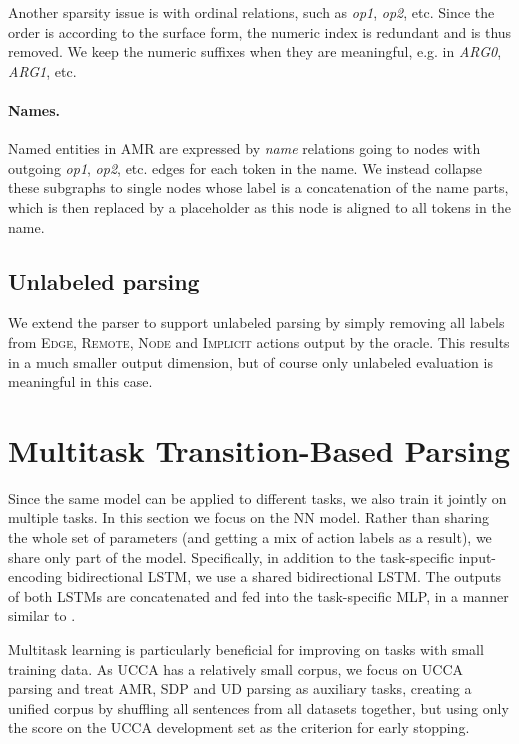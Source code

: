 \documentclass[11pt,a4paper]{article}
\begin{document}
Another sparsity issue is with ordinal relations, such as \textit{op1}, \textit{op2}, etc.
Since the order is according to the surface form, the numeric index is redundant and is thus removed.
We keep the numeric suffixes when they are meaningful, e.g. in \textit{ARG0}, \textit{ARG1}, etc.

\paragraph{Names.}
Named entities in AMR are expressed by \textit{name} relations going to nodes with outgoing
\textit{op1}, \textit{op2}, etc. edges for each token in the name.
We instead collapse these subgraphs to single nodes whose label is a concatenation of the
name parts, which is then replaced by a placeholder as this node is aligned to all tokens in the name.


\subsection{Unlabeled parsing}\label{sec:unlabeled}

We extend the parser to support unlabeled parsing by simply removing all labels from
\textsc{Edge}, \textsc{Remote}, \textsc{Node} and \textsc{Implicit} actions output by the oracle.
This results in a much smaller output dimension, but of course only unlabeled evaluation is
meaningful in this case.



\section{Multitask Transition-Based Parsing}\label{sec:multitask}

Since the same model can be applied to different tasks, we also train it jointly on multiple tasks.
In this section we focus on the NN model.
Rather than sharing the whole set of parameters (and getting a mix of action labels as a result),
we share only part of the model.
Specifically, in addition to the task-specific input-encoding bidirectional LSTM,
we use a shared bidirectional LSTM. The outputs of both LSTMs are concatenated and
fed into the task-specific MLP, in a manner similar to \citet{P17-1186}.

Multitask learning is particularly beneficial for improving on tasks with small training data.
As UCCA has a relatively small corpus, we focus on UCCA parsing and treat AMR, SDP and UD parsing
as auxiliary tasks, creating a unified corpus by shuffling all sentences from all datasets together,
but using only the score on the UCCA development set as the criterion for early stopping.
\end{document}
